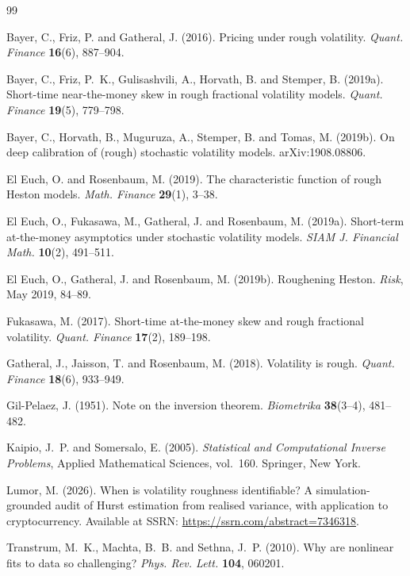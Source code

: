 \documentclass[namedate,webpdf]{ima-authoring-template}
\numberwithin{equation}{section}
\begin{document}
\begin{thebibliography}{99}

 Bayer, C., Friz, P. and Gatheral, J. (2016).
Pricing under rough volatility.
\emph{Quant. Finance} \textbf{16}(6), 887--904.

 Bayer, C., Friz, P.~K., Gulisashvili, A., Horvath, B.
and Stemper, B. (2019a).
Short-time near-the-money skew in rough fractional volatility models.
\emph{Quant. Finance} \textbf{19}(5), 779--798.

 Bayer, C., Horvath, B., Muguruza, A., Stemper, B.
and Tomas, M. (2019b).
On deep calibration of (rough) stochastic volatility models. arXiv:1908.08806.

 El Euch, O. and Rosenbaum, M. (2019).
The characteristic function of rough Heston models.
\emph{Math. Finance} \textbf{29}(1), 3--38.

 El Euch, O., Fukasawa, M., Gatheral, J.
and Rosenbaum, M. (2019a).
Short-term at-the-money asymptotics under stochastic volatility models.
\emph{SIAM J. Financial Math.} \textbf{10}(2), 491--511.

 El Euch, O., Gatheral, J. and Rosenbaum, M. (2019b).
Roughening Heston. \emph{Risk}, May 2019, 84--89.

 Fukasawa, M. (2017).
Short-time at-the-money skew and rough fractional volatility.
\emph{Quant. Finance} \textbf{17}(2), 189--198.

 Gatheral, J., Jaisson, T. and Rosenbaum, M. (2018).
Volatility is rough. \emph{Quant. Finance} \textbf{18}(6), 933--949.

 Gil-Pelaez, J. (1951).
Note on the inversion theorem. \emph{Biometrika} \textbf{38}(3--4), 481--482.

 Kaipio, J.~P. and
Somersalo, E. (2005). \emph{Statistical and Computational Inverse Problems},
Applied Mathematical Sciences, vol.~160. Springer, New York.

 Lumor, M. (2026).
When is volatility roughness identifiable? A simulation-grounded audit of Hurst
estimation from realised variance, with application to cryptocurrency. Available at
SSRN: \url{https://ssrn.com/abstract=7346318}.

 Transtrum, M.~K., Machta, B.~B.
and Sethna, J.~P. (2010). Why are nonlinear fits to data so challenging?
\emph{Phys. Rev. Lett.} \textbf{104}, 060201.

\end{thebibliography}
\end{document}
